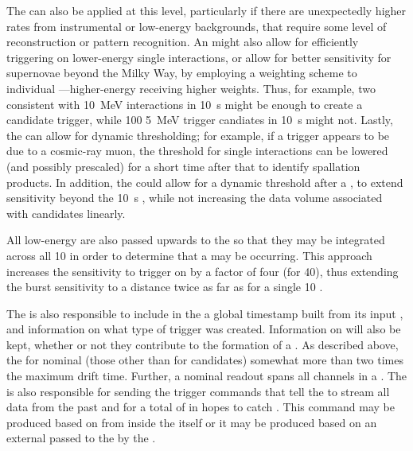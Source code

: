	
The  can also be applied at this level, particularly if
there are unexpectedly higher rates from instrumental or low-energy
backgrounds, that require some level of reconstruction or pattern
recognition. 
An  might also allow for efficiently triggering on
lower-energy single interactions, or allow for better sensitivity for
supernovae beyond the Milky Way, by employing a weighting scheme to
individual ---higher-energy
 receiving higher weights. 
Thus, for example, two  consistent with
\SI{10}{\MeV} interactions in \SI{10}{\s} might be enough to create a
 candidate trigger, while 100 \SI{5}{\MeV} trigger
candiates in \SI{10}{\s} might not.
Lastly, the  can allow for dynamic thresholding; for
example, if a trigger appears to be due to a cosmic-ray muon, the
threshold for single interactions can be lowered (and possibly
prescaled) for a short time after that to identify spallation
products. 
In addition, the  could allow for a dynamic threshold after
a , to extend sensitivity beyond the \SI{10}{\s}
 , while not increasing the data
volume associated with  candidates linearly. 

All low-energy  are also passed upwards to the
 so that they may be integrated across all \SI{10}{\kton}
 in order to determine that a  may be
occurring. 
This approach increases the sensitivity to trigger on  by
a factor of four (for \SI{40}{\kton}), thus extending the burst
sensitivity to a distance twice as far as for a single \SI{10}{\kton}
. 

	
The  is also responsible to include in the
 a global timestamp built from its input
, and information on what type of trigger was
created. 
Information on  will also be kept, whether or not
they contribute to the formation of a . 
As described above, the  for nominal
 (those other than for  candidates)
somewhat more than two times the maximum drift time. 
Further, a nominal readout spans all channels in a . 
The  is also responsible for sending the trigger commands
that tell the  to stream all data from the past
\snbpretime and for a total of \snbtime in hopes to catch
.
This command may be produced based on  from
inside the  itself or it may be produced based on an external
  passed to the  by the
.
